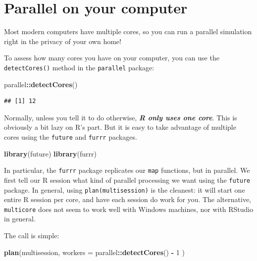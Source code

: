\documentclass[
]{book}
\newenvironment{Shaded}{\begin{snugshade}}{\end{snugshade}}
\newcommand{\AttributeTok}[1]{\textcolor[rgb]{0.13,0.29,0.53}{#1}}
\newcommand{\DecValTok}[1]{\textcolor[rgb]{0.00,0.00,0.81}{#1}}
\newcommand{\FunctionTok}[1]{\textcolor[rgb]{0.13,0.29,0.53}{\textbf{#1}}}
\newcommand{\NormalTok}[1]{#1}
\newcommand{\SpecialCharTok}[1]{\textcolor[rgb]{0.81,0.36,0.00}{\textbf{#1}}}
\begin{document}
\section{Parallel on your computer}\label{parallel-on-your-computer}

Most modern computers have multiple cores, so you can run a parallel simulation right in the privacy of your own home!

To assess how many cores you have on your computer, you can use the \texttt{detectCores()} method in the \texttt{parallel} package:

\begin{Shaded}
\begin{Highlighting}[]
\NormalTok{parallel}\SpecialCharTok{::}\FunctionTok{detectCores}\NormalTok{()}
\end{Highlighting}
\end{Shaded}

\begin{verbatim}
## [1] 12
\end{verbatim}

Normally, unless you tell it to do otherwise, \textbf{\emph{R only uses one core}}.
This is obviously a bit lazy on R's part.
But it is easy to take advantage of multiple cores using the \texttt{future} and \texttt{furrr} packages.

\begin{Shaded}
\begin{Highlighting}[]
\FunctionTok{library}\NormalTok{(future)}
\FunctionTok{library}\NormalTok{(furrr)}
\end{Highlighting}
\end{Shaded}

In particular, the \texttt{furrr} package replicates our \texttt{map} functions, but in parallel.
We first tell our R session what kind of parallel processing we want using the \texttt{future} package.
In general, using \texttt{plan(multisession)} is the cleanest: it will start one entire R session per core, and have each session do work for you.
The alternative, \texttt{multicore} does not seem to work well with Windows machines, nor with RStudio in general.

The call is simple:

\begin{Shaded}
\begin{Highlighting}[]
\FunctionTok{plan}\NormalTok{(multisession, }\AttributeTok{workers =}\NormalTok{ parallel}\SpecialCharTok{::}\FunctionTok{detectCores}\NormalTok{() }\SpecialCharTok{{-}} \DecValTok{1}\NormalTok{ )}
\end{Highlighting}
\end{Shaded}
\end{document}
